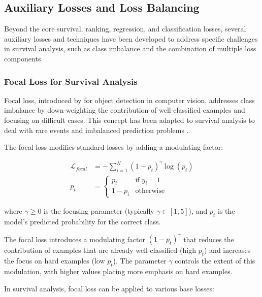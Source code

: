 \subsection{Auxiliary Losses and Loss Balancing}

Beyond the core survival, ranking, regression, and classification losses, several auxiliary losses and techniques have been developed to address specific challenges in survival analysis, such as class imbalance and the combination of multiple loss components.

\subsubsection{Focal Loss for Survival Analysis}

Focal loss, introduced by \textcite{lin2017focal} for object detection in computer vision, addresses class imbalance by down-weighting the contribution of well-classified examples and focusing on difficult cases. This concept has been adapted to survival analysis to deal with rare events and imbalanced prediction problems \parencite{steiner2021,fotso2018,wiegrebe2023}.

\begin{definitionbox}[title=Focal Loss for Survival]
  The focal loss modifies standard losses by adding a modulating factor:

  \begin{align}
    \mathcal{L}_{focal} &= -\sum_{i=1}^N (1 - p_t)^\gamma \log(p_t) \\
    p_t &= \begin{cases}
      p_i & \text{if } y_i = 1 \\
      1-p_i & \text{otherwise}
    \end{cases}
  \end{align}

  where $\gamma \geq 0$ is the focusing parameter (typically $\gamma \in [1,5]$), and $p_t$ is the model's predicted probability for the correct class.
\end{definitionbox}

The focal loss introduces a modulating factor $(1 - p_t)^\gamma$ that reduces the contribution of examples that are already well-classified (high $p_t$) and increases the focus on hard examples (low $p_t$). The parameter $\gamma$ controls the extent of this modulation, with higher values placing more emphasis on hard examples.

In survival analysis, focal loss can be applied to various base losses:

